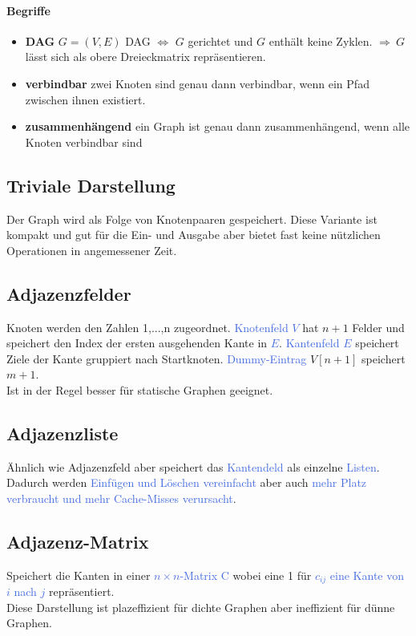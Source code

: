 \documentclass[11pt]{article}
\def \texcol{RoyalBlue}
\begin{document}
\paragraph{Begriffe}
\begin{itemize}
\item \textbf{DAG} $G=(V,E)$ DAG $\Longleftrightarrow$ $G$ gerichtet und $G$ enthält keine Zyklen. $\Longrightarrow\ G$ lässt sich als obere Dreieckmatrix repräsentieren.
\item \textbf{verbindbar} zwei Knoten sind genau dann verbindbar, wenn ein Pfad zwischen ihnen existiert.
\item \textbf{zusammenhängend} ein Graph ist genau dann zusammenhängend, wenn alle Knoten verbindbar sind
\end{itemize}

\subsection{Triviale Darstellung}
Der Graph wird als Folge von Knotenpaaren gespeichert. Diese Variante ist kompakt und gut für die Ein- und Ausgabe aber bietet fast keine nützlichen Operationen in angemessener Zeit.

\subsection{Adjazenzfelder}
Knoten werden den Zahlen 1,...,n zugeordnet. \textcolor{\texcol}{Knotenfeld $V$} hat $n+1$ Felder und speichert den Index der ersten ausgehenden Kante in \textcolor{\texcol}{$E$}. \textcolor{\texcol}{Kantenfeld $E$} speichert Ziele der Kante gruppiert nach Startknoten. \textcolor{\texcol}{Dummy-Eintrag} $V[n+1]$ speichert $m+1$.\\
Ist in der Regel besser für statische Graphen geeignet.

\subsection{Adjazenzliste}
Ähnlich wie Adjazenzfeld aber speichert das \textcolor{\texcol}{Kantendeld} als einzelne \textcolor{\texcol}{Listen}. Dadurch werden \textcolor{\texcol}{Einfügen und Löschen vereinfacht} aber auch \textcolor{\texcol}{mehr Platz verbraucht und mehr Cache-Misses verursacht}.

\subsection{Adjazenz-Matrix}
Speichert die Kanten in einer \textcolor{\texcol}{$n\times n$-Matrix C} wobei eine 1 für \textcolor{\texcol}{$c_{ij}$ eine Kante von $i$ nach $j$} repräsentiert.\\
Diese Darstellung ist plazeffizient für dichte Graphen aber ineffizient für dünne Graphen.
\end{document}
